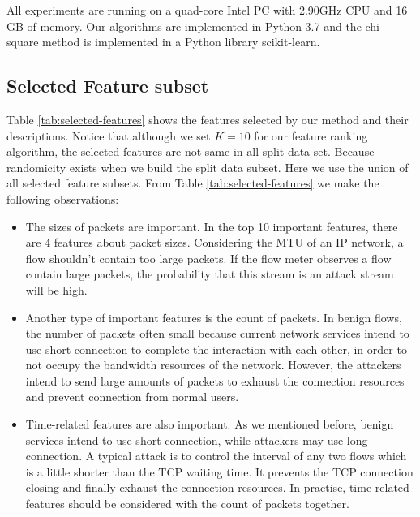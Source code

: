 \documentclass{ieeeaccess}
\theoremstyle{definition}
\begin{document}
All experiments are running on a quad-core Intel PC with 2.90GHz CPU and 16 GB of memory. Our algorithms are implemented in Python 3.7 and the chi-square method is implemented in a Python library scikit-learn\cite{sklearn}.

\subsection{Selected Feature subset}

Table \ref{tab:selected-features} shows the features selected by our method and their descriptions. Notice that although we set $K=10$ for our feature ranking algorithm, the selected features are not same in all split data set. Because randomicity exists when we build the split data subset. Here we use the union of all selected feature subsets. From Table \ref{tab:selected-features} we make the following observations:

\begin{itemize}
	\item The sizes of packets are important. In the top 10 important features, there are 4 features about packet sizes. Considering the MTU of an IP network, a flow shouldn’t contain too large packets. If the flow meter observes a flow contain large packets, the probability that this stream is an attack stream will be high. 
    \item Another type of important features is the count of packets. In benign flows, the number of packets often small because current network services intend to use short connection to complete the interaction with each other, in order to not occupy the bandwidth resources of the network. However, the attackers intend to send large amounts of packets to exhaust the connection resources and prevent connection from normal users. 
    \item Time-related features are also important. As we mentioned before, benign services intend to use short connection, while attackers may use long connection. A typical attack is to control the interval of any two flows which is a little shorter than the TCP waiting time. It prevents the TCP connection closing and finally exhaust the connection resources. In practise, time-related features should be considered with the count of packets together.
\end{itemize} 
\end{document}
